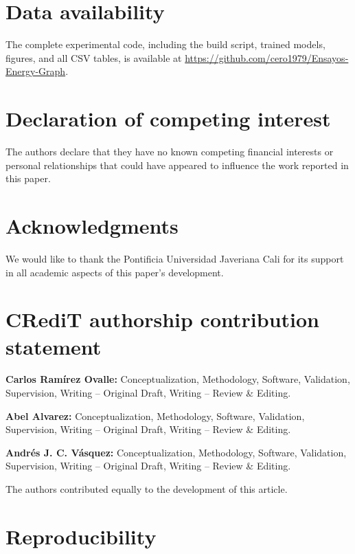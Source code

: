 \documentclass[a4paper,fleqn]{cas-sc}
\theoremstyle{remark}
\theoremstyle{definition}
\begin{document}
\section*{Data availability}

The complete experimental code, including the build script, trained models, figures, and all CSV tables, is available at \url{https://github.com/cero1979/Ensayos-Energy-Graph}.

\section*{Declaration of competing interest}

The authors declare that they have no known competing financial interests or personal relationships that could have appeared to influence the work reported in this paper.

\section*{Acknowledgments}
We would like to thank the Pontificia Universidad Javeriana Cali for its support in all academic aspects of this paper's development.
\section*{CRediT authorship contribution statement}
\textbf{Carlos Ramírez Ovalle:} Conceptualization, Methodology, Software, Validation, Supervision, Writing -- Original Draft, Writing -- Review \& Editing.

\textbf{Abel Alvarez:} Conceptualization, Methodology, Software, Validation, Supervision, Writing -- Original Draft, Writing -- Review \& Editing.

\textbf{Andr\'es J. C. V\'asquez:} Conceptualization, Methodology, Software, Validation, Supervision, Writing -- Original Draft, Writing -- Review \& Editing.

\medskip
\noindent The authors contributed equally to the development of this article.

\appendix

\section{Reproducibility}\label{app:reproducibility}
\end{document}
